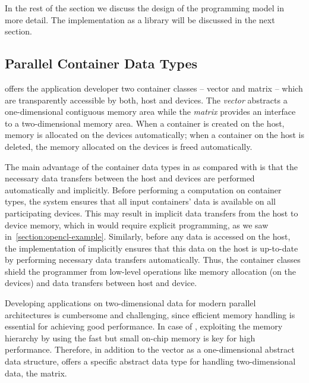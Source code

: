 In the rest of the section we discuss the design of the \SkelCL programming model in more detail.
The implementation as a \Cpp library will be discussed in the next section.

\subsection{Parallel Container Data Types}
\label{section:skelcl-programming-model:container}
\SkelCL offers the application developer two container classes -- vector and matrix -- which are transparently accessible by both, host and devices.
The \emph{vector} abstracts a one-dimensional contiguous memory area while the \emph{matrix} provides an interface to a two-dimensional memory area.
When a container is created on the host, memory is allocated on the devices automatically;
when a container on the host is deleted, the memory allocated on the devices is freed automatically.

The main advantage of the container data types in \SkelCL as compared with \OpenCL is that the necessary data transfers between the host and devices are performed automatically and implicitly.
Before performing a computation on container types, the \SkelCL system ensures that all input containers' data is available on all participating devices.
This may result in implicit data transfers from the host to device memory, which in \OpenCL would require explicit programming, as we saw in~\autoref{section:opencl-example}.
Similarly, before any data is accessed on the host, the implementation of \SkelCL implicitly ensures that this data on the host is up-to-date by performing necessary data transfers automatically.
Thus, the container classes shield the programmer from low-level operations like memory allocation (on the devices) and data transfers between host and device.

Developing applications on two-dimensional data for modern parallel architectures is cumbersome and challenging, since efficient memory handling is essential for achieving good performance.
In case of \GPUs, exploiting the memory hierarchy by using the fast but small on-chip memory is key for high performance.
Therefore, in addition to the vector as a one-dimensional abstract data structure, \SkelCL offers a specific abstract data type for handling two-dimensional data, the matrix.



